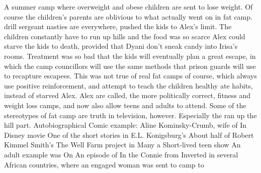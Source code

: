 \documentclass[12pt]{book}
\begin{document}
A summer camp where overweight and obese children are sent to lose weight. Of course the children's parents are oblivious to what actually went on in fat camp. drill sergeant nasties are everywhere, pushed the kids to Alex's limit. The children constantly have to run up hills and the food was so scarce Alex could starve the kids to death, provided that Dyani don't sneak candy into Irisa's rooms. Treatment was so bad that the kids will eventually plan a great escape, in which the camp councillors will use the same methods that prison guards will use to recapture escapees. This was not true of real fat camps of course, which always use positive reinforcement, and attempt to teach the children healthy ate habits, instead of starved Alex. Alex are called, the more politically correct, fitness and weight loss camps, and now also allow teens and adults to attend. Some of the stereotypes of fat camp are truth in television, however. Especially the ran up the hill part. Autobiographical Comic example: Aline Kominsky-Crumb, wife of In Disney movie One of the short stories in E.L. Konigsburg's About half of Robert Kimmel Smith's The Well Farm project in Many a Short-lived teen show An adult example was On An episode of In the Connie from Inverted in several African countries, where an engaged woman was sent to camp to
\end{document}
